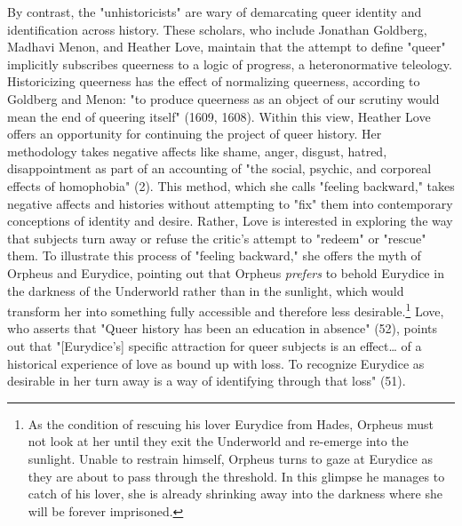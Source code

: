 \documentclass[11pt]{article}
\begin{document}
By contrast, the "unhistoricists" are wary of demarcating queer
identity and identification across history. These scholars, who
include Jonathan Goldberg, Madhavi Menon, and Heather Love, maintain
that the attempt to define "queer" implicitly subscribes queerness to
a logic of progress, a heteronormative teleology. Historicizing
queerness has the effect of normalizing queerness, according to
Goldberg and Menon: "to produce queerness as an object of our scrutiny
would mean the end of queering itself" (1609, 1608). Within this view,
Heather Love offers an opportunity for continuing the project of queer
history. Her methodology takes negative affects like shame, anger,
disgust, hatred, disappointment as part of an accounting of "the
social, psychic, and corporeal effects of homophobia" (2). This
method, which she calls "feeling backward," takes negative affects and
histories without attempting to "fix" them into contemporary
conceptions of identity and desire. Rather, Love is interested in
exploring the way that subjects turn away or refuse the critic's
attempt to "redeem" or "rescue" them. To illustrate this process of
"feeling backward," she offers the myth of Orpheus and Eurydice,
pointing out that Orpheus \emph{prefers} to behold Eurydice in the darkness
of the Underworld rather than in the sunlight, which would transform
her into something fully accessible and therefore less
desirable.\footnote{As the condition of rescuing his lover Eurydice from Hades, Orpheus
must not look at her until they exit the Underworld and re-emerge into
the sunlight. Unable to restrain himself, Orpheus turns to gaze at
Eurydice as they are about to pass through the threshold. In this
glimpse he manages to catch of his lover, she is already shrinking away
into the darkness where she will be forever imprisoned.\label{orgc47904c}} Love, who asserts that "Queer history has been an
education in absence" (52), points out that "[Eurydice's] specific
attraction for queer subjects is an effect\ldots{} of a historical
experience of love as bound up with loss. To recognize Eurydice as
desirable in her turn away is a way of identifying through that loss"
(51). 
\end{document}
